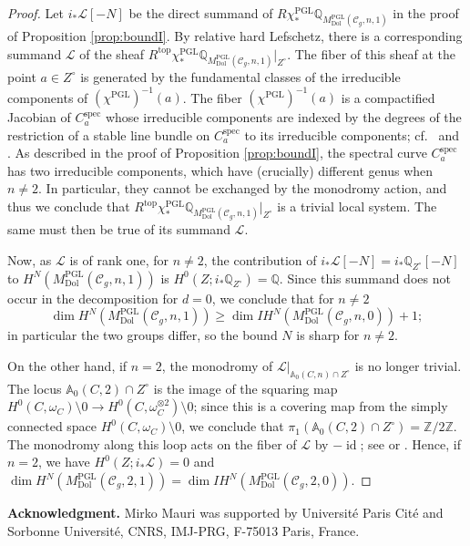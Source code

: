 \documentclass[11pt,reqno]{amsart}
\theoremstyle{plain} %
\theoremstyle{definition}
\newcommand{\QQ}{\mathbb{Q}}
\newcommand{\C}{\mathcal{C}}
\newcommand{\ZZ}{\mathbb{Z}}
\DeclareMathOperator{\PGL}{PGL}
\DeclareMathOperator{\id}{id}
\newcommand{\Dol}{\mathrm{Dol}}
\newcommand{\IH}{I\!H}
\renewcommand{\AA}{\mathbb{A}}
\DeclareMathOperator{\spec}{spec}
\begin{document}
\begin{proof} 
 Let $i_* \mathcal{L}[-N]$ be the direct summand of $R \chi^{\PGL}_* \QQ_{M^{\PGL}_{\Dol}(\C_g,n,1)}$ in the proof of Proposition \ref{prop:boundI}. By relative hard Lefschetz, there is a corresponding summand $\mathcal{L}$ of the sheaf $R^{\textrm{top}}\chi_*^{\PGL} \QQ_{M^{\PGL}_{\Dol}(\C_g,n,1)}|_{Z^\circ}$. The fiber of this sheaf at the point $a \in Z^\circ$ is generated by the fundamental classes of the irreducible components of $(\chi^{\PGL})^{-1}(a)$. 
The fiber $(\chi^{\PGL})^{-1}(a)$ is a compactified Jacobian of $C^{\spec}_{a}$ whose irreducible components are indexed by the degrees of the restriction of a stable line bundle on $C^{\spec}_a$ to its irreducible components; cf.~\cite[\S 4]{dCHM2021} and \cite[Proposition 7.6.(ii)]{MMP2023}. As described in the proof of Proposition \ref{prop:boundI}, the spectral curve $C^{\spec}_a$ has two irreducible components, which have (crucially) different genus when $n \neq 2$. 
In particular, they cannot be exchanged by the monodromy action, and thus we conclude that $R^{\mathrm{top}}\chi_*^{\PGL} \QQ_{M^{\PGL}_{\Dol}(\C_g,n,1)}|_{Z^\circ}$ is a trivial local system. The same must then be true of its summand $\mathcal{L}$.

Now, as $\mathcal{L}$ is of rank one, for $n \neq 2$, the contribution of $i_* \mathcal{L}[-N] = i_* \QQ_{Z^\circ}[-N]$ to $H^N(M^{\PGL}_{\Dol}(\C_g,n,1))$ is $H^0(Z; i_* \QQ_{Z^\circ}) = \QQ$. Since this summand does not occur in the decomposition for $d=0$, we conclude that for $n \neq 2$
$$\dim H^{N}(M^{\PGL}_{\Dol}(\C_g,n,1)) \geq \dim \IH^{N}(M^{\PGL}_{\Dol}(\C_g,n,0))+1;$$
in particular the two groups differ, so the bound $N$ is sharp for $n \neq 2$.

On the other hand, if $n=2$, the monodromy of $\mathcal{L}|_{\AA_{0}(C, n) \cap Z^{\circ}}$ is no longer trivial. The locus $\AA_0(C,2) \cap Z^\circ$ is the image of the squaring map $H^{0}(C, \omega_C)\setminus 0 \to H^{0}(C, \omega^{\otimes 2}_C) \setminus 0$; since this is a covering map from the simply connected space $H^0(C, \omega_C) \setminus 0$, we conclude that $\pi_1(\AA_0(C,2) \cap Z^\circ)=\ZZ/2\ZZ$. The monodromy along this loop acts on the fiber of $\mathcal{L}$ by $-\id$; see \cite[Corollary 6.20]{dCFHM} or \cite[Theorem 1.6]{MMP2023}. Hence, if $n=2$, we have $H^0(Z; i_* \mathcal{L}) = 0$ and
$\dim H^{N}(M^{\PGL}_{\Dol}(\C_g,2,1)) = \dim \IH^{N}(M^{\PGL}_{\Dol}(\C_g,2,0)).$
\end{proof} 

\noindent\textbf{Acknowledgment.} Mirko Mauri was supported by Université Paris Cité and Sorbonne Université, CNRS, IMJ-PRG, F-75013 Paris, France. 




\end{document}
